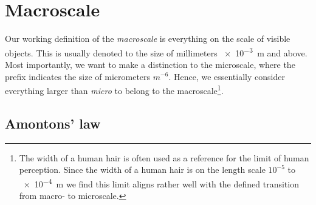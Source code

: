 









\section{Macroscale}\label{sec:macroscale}
Our working definition of the \textit{macroscale} is everything on the scale of visible objects. This is usually denoted to the size of millimeters \SI{e-3}{\metre} and above. Most importantly, we want to make a distinction to the microscale, where the prefix indicates the size of micrometers $m^{-6}$. Hence, we essentially consider everything larger than \textit{micro} to belong to the macroscale\footnote{The width of a human hair is often used as a reference for the limit of human perception. Since the width of a human hair is on the length scale $10^{-5}$ to \SI{e-4}{m} we find this limit aligns rather well with the defined transition from macro- to microscale.}.

\subsection{Amontons’ law}
 
